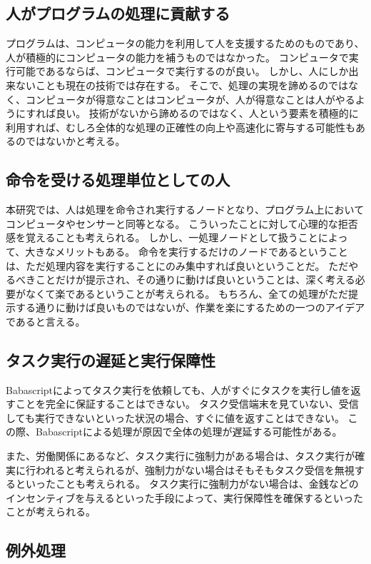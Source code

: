 \documentclass[twoside]{wiss}
\begin{document}
\subsection{人がプログラムの処理に貢献する}

プログラムは、コンピュータの能力を利用して人を支援するためのものであり、人が積極的にコンピュータの能力を補うものではなかった。
コンピュータで実行可能であるならば、コンピュータで実行するのが良い。
しかし、人にしか出来ないことも現在の技術では存在する。
そこで、処理の実現を諦めるのではなく、コンピュータが得意なことはコンピュータが、人が得意なことは人がやるようにすれば良い。
技術がないから諦めるのではなく、人という要素を積極的に利用すれば、むしろ全体的な処理の正確性の向上や高速化に寄与する可能性もあるのではないかと考える。

\subsection{命令を受ける処理単位としての人}

本研究では、人は処理を命令され実行するノードとなり、プログラム上においてコンピュータやセンサーと同等となる。
こういったことに対して心理的な拒否感を覚えることも考えられる。
しかし、一処理ノードとして扱うことによって、大きなメリットもある。
命令を実行するだけのノードであるということは、ただ処理内容を実行することにのみ集中すれば良いということだ。
ただやるべきことだけが提示され、その通りに動けば良いということは、深く考える必要がなくて楽であるということが考えられる。
もちろん、全ての処理がただ提示する通りに動けば良いものではないが、作業を楽にするための一つのアイデアであると言える。

\subsection{タスク実行の遅延と実行保障性}

Babascriptによってタスク実行を依頼しても、人がすぐにタスクを実行し値を返すことを完全に保証することはできない。
タスク受信端末を見ていない、受信しても実行できないといった状況の場合、すぐに値を返すことはできない。
この際、Babascriptによる処理が原因で全体の処理が遅延する可能性がある。

また、労働関係にあるなど、タスク実行に強制力がある場合は、タスク実行が確実に行われると考えられるが、強制力がない場合はそもそもタスク受信を無視するといったことも考えられる。
タスク実行に強制力がない場合は、金銭などのインセンティブを与えるといった手段によって、実行保障性を確保するといったことが考えられる。

\subsection{例外処理}
\end{document}
